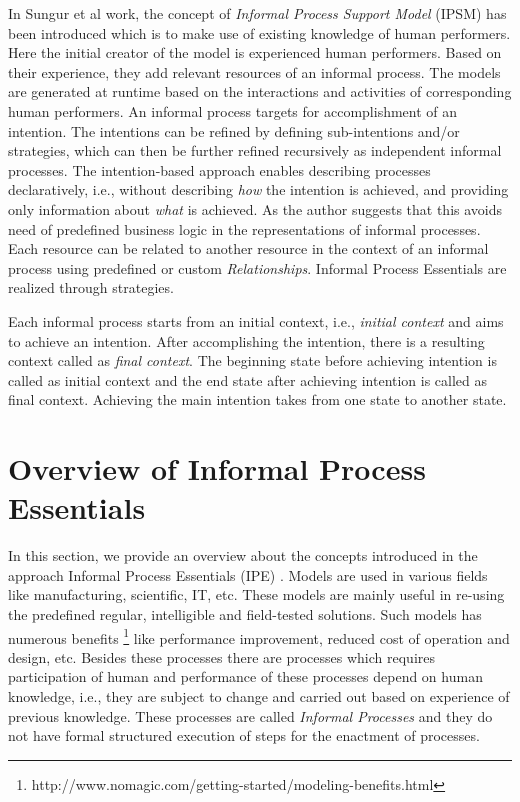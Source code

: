 In Sungur et al \cite{Sungur2014a} work, the concept of \textit{Informal Process Support Model} (IPSM) has been introduced which is to make use of existing knowledge of human performers. Here the initial creator of the model is experienced human performers. Based on their experience, they add relevant  resources of an informal process. The models are generated at runtime based on the interactions and activities of corresponding human performers. An informal process targets for accomplishment of an intention. The intentions can be refined by defining sub-intentions and/or strategies, which can then be further refined recursively as independent informal processes. The intention-based approach enables describing processes declaratively, i.e., without describing \textit{how} the intention is achieved, and providing only information about \textit{what} is achieved. As the author \cite{Sungur2014a} suggests that this avoids need of predefined business logic in the representations of informal processes. Each resource can be related to another resource in the context of an informal process using predefined or custom \textit{Relationships}. Informal Process Essentials are realized through strategies.

Each informal process starts from an initial context, i.e., \textit{initial context} and aims to achieve an intention. After accomplishing the intention, there is a resulting context called as \textit{final context}. The beginning state before achieving intention is called as initial context and the end state after achieving intention is called as final context. Achieving the main intention takes from one state to another state. 

\section{Overview of Informal Process Essentials}
\label{sec:basicconcepts}
In this section, we provide an overview about the concepts introduced in the approach Informal Process Essentials (IPE) \cite{Sungur2014a}. Models are used in various fields like manufacturing, scientific, IT, etc. These models are mainly useful in re-using the predefined regular, intelligible and field-tested solutions. Such models has numerous benefits \footnote{http://www.nomagic.com/getting-started/modeling-benefits.html} like performance improvement, reduced cost of operation and design, etc. Besides these processes there are processes which requires participation of human and performance of these  processes depend on human knowledge, i.e., they are subject to change and carried out based on experience of previous knowledge. These processes are called \textit{Informal Processes} and they do not have formal structured execution of steps for the enactment of processes. 

